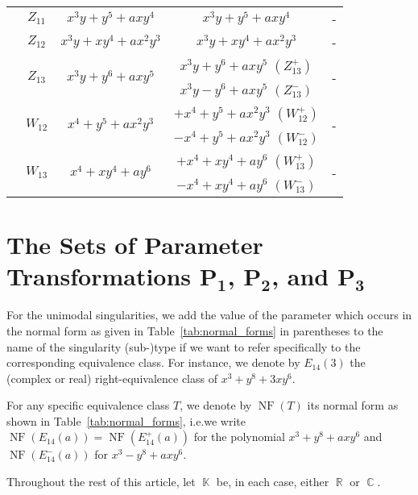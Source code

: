 \documentclass[noend]{amsproc}
\theoremstyle{definition}
\newcommand{\NF}[1]{\operatorname{NF}(#1)}
\DeclareMathOperator{\R}{\mathbb{R}}
\DeclareMathOperator{\C}{\mathbb{C}}
\DeclareMathOperator{\K}{\mathbb{K}}
\begin{document}
\begin{table}[tp]
\begin{tabular}{|c|c|c|c|c|}
& $Z_{11}$ & $x^3y+y^5+axy^4$ & $x^3y+y^5+axy^4$ & - \\ \cline{2-5}

& $Z_{12}$ & $x^3y+xy^4+ax^2y^3$ & $x^3y+xy^4+ax^2y^3$ & - \\ \cline{2-5}

& \multirow{2}{*}{$Z_{13}$} & \multirow{2}{*}{$x^3y+y^6+axy^5$}
  & $x^3y+y^6+axy^5$ $(Z_{13}^+)$ & \multirow{2}{*}{-} \\ \cline{4-4}
&&& $x^3y-y^6+axy^5$ $(Z_{13}^-)$ &                    \\ \cline{2-5}

& \multirow{2}{*}{$W_{12}$} & \multirow{2}{*}{$x^4+y^5+ax^2y^3$}
  & $+x^4+y^5+ax^2y^3$ $(W_{12}^+)$ & \multirow{2}{*}{-} \\ \cline{4-4}
&&& $-x^4+y^5+ax^2y^3$ $(W_{12}^-)$ &                    \\ \cline{2-5}

& \multirow{2}{*}{$W_{13}$} & \multirow{2}{*}{$x^4+xy^4+ay^6$}
  & $+x^4+xy^4+ay^6$ $(W_{13}^+)$ & \multirow{2}{*}{-} \\ \cline{4-4}
&&& $-x^4+xy^4+ay^6$ $(W_{13}^-)$ &                    \\ \hline

\end{tabular}
\end{table}
\section{The Sets of Parameter Transformations
$\boldsymbol{P_1}$, $\boldsymbol{P_2}$, and $\boldsymbol{P_3}$}

For the unimodal singularities, we add the value of the parameter which occurs
in the normal form as given in Table~\ref{tab:normal_forms} in parentheses to
the name of the singularity (sub-)type if we want to refer specifically to the
corresponding equivalence class. For instance, we denote by $E_{14}(3)$ the
(complex or real) right-equivalence class of $x^3+y^8+3xy^6$.

For any specific equivalence class $T$, we denote by $\NF{T}$ its normal form
as shown in Table~\ref{tab:normal_forms}, i.e.\@ we write
$\NF{E_{14}(a)} = \NF{E_{14}^+(a)}$ for the polynomial $x^3+y^8+axy^6$ and
$\NF{E_{14}^-(a)}$ for $x^3-y^8+axy^6$.

Throughout the rest of this article, let $\K$ be, in each case, either $\R$ or
$\C$.
\end{document}
